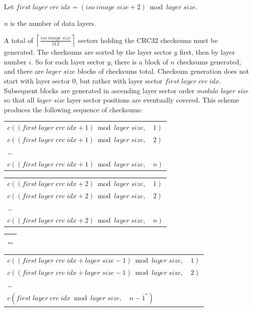 \smallskip

Let $first\; layer\; crc\; idx = (iso\; image\; size + 2) \bmod layer\; size$. 

$n$ is the number of data layers.

\smallskip

A total of $\left\lceil\frac{iso\; image\; size}{512}\right\rceil$ sectors holding the
CRC32 checksums must be generated. The checksums are sorted by the layer sector $y$ first, 
then by layer number $i$. So for each layer sector $y$, there is a block of $n$ checksums generated,
and there are $layer\; size$ blocks of checksums total. Checksum generation does not start with
layer sector $0$, but rather with layer sector $first\; layer\; crc\; idx$. Subsequent blocks
are generated in ascending layer sector order {\em modulo layer size} so that all
{\em layer  size} layer sector positions are eventually covered. 
This scheme produces the following
sequence of checksums: 

\medskip

\begin{tabular}{l}
$c((first\; layer\; crc\; idx + 1) \bmod layer\; size, \quad 1)$\\
$c((first\; layer\; crc\; idx + 1) \bmod layer\; size, \quad 2)$\\
\dots\\
$c((first\; layer\; crc\; idx + 1) \bmod layer\; size, \quad n)$\\
\hline
\end{tabular}

\begin{tabular}{l}

$c((first\; layer\; crc\; idx + 2) \bmod layer\; size, \quad 1)$\\
$c((first\; layer\; crc\; idx + 2) \bmod layer\; size, \quad 2)$\\
\dots\\
$c((first\; layer\; crc\; idx + 2) \bmod layer\; size, \quad n)$\\
\hline
\end{tabular}

\begin{tabular}{l}
\dots\hspace*{81mm}\\[1mm]
\hline
\end{tabular}

\begin{tabular}{l}
$c((first\; layer\; crc\; idx + layer\; size -1) \bmod layer\; size, \quad 1)$\\
$c((first\; layer\; crc\; idx + layer\; size -1) \bmod layer\; size, \quad 2)$\\
\dots\\
$c(first\; layer\; crc\; idx \bmod layer\; size, \quad n-1^*)$\\
\hline
\end{tabular}

